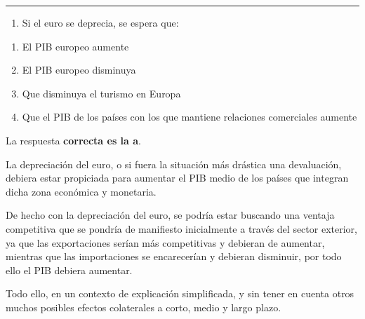 \documentclass[
  letterpaper,
  DIV=11,
  numbers=noendperiod]{scrreprt}
\providecommand{\tightlist}{%
  \setlength{\itemsep}{0pt}\setlength{\parskip}{0pt}}\usepackage{longtable,booktabs,array}
\begin{document}
\begin{center}\rule{0.5\linewidth}{0.5pt}\end{center}

\begin{enumerate}
\def\labelenumi{\arabic{enumi}.}
\setcounter{enumi}{16}
\tightlist
\item
  Si el euro se deprecia, se espera que:
\end{enumerate}

\begin{enumerate}
\def\labelenumi{\alph{enumi})}
\item
  El PIB europeo aumente
\item
  El PIB europeo disminuya
\item
  Que disminuya el turismo en Europa
\item
  Que el PIB de los países con los que mantiene relaciones comerciales
  aumente
\end{enumerate}

\begin{tcolorbox}[enhanced jigsaw, left=2mm, opacityback=0, colback=white, breakable, arc=.35mm, bottomrule=.15mm, rightrule=.15mm, toprule=.15mm, leftrule=.75mm, colframe=quarto-callout-tip-color-frame]
\begin{minipage}[t]{5.5mm}
\textcolor{quarto-callout-tip-color}{\faLightbulb}
\end{minipage}%
\begin{minipage}[t]{\textwidth - 5.5mm}

La respuesta \textbf{correcta es la a}.

La depreciación del euro, o si fuera la situación más drástica una
devaluación, debiera estar propiciada para aumentar el PIB medio de los
países que integran dicha zona económica y monetaria.

De hecho con la depreciación del euro, se podría estar buscando una
ventaja competitiva que se pondría de manifiesto inicialmente a través
del sector exterior, ya que las exportaciones serían más competitivas y
debieran de aumentar, mientras que las importaciones se encarecerían y
debieran disminuir, por todo ello el PIB debiera aumentar.

Todo ello, en un contexto de explicación simplificada, y sin tener en
cuenta otros muchos posibles efectos colaterales a corto, medio y largo
plazo.

\end{minipage}%
\end{tcolorbox}
\end{document}
